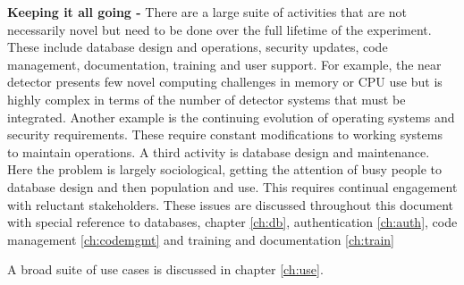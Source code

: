 \documentclass[../main-v1.tex]{subfiles}
\begin{document}
\begin{description}
\item{\bf Keeping it all going -}  There are a large suite of activities that are not necessarily novel but need to be done over the full lifetime of the experiment.  These include database design and operations, security updates, code management, documentation, training and user support.   For example, the near detector presents few novel computing challenges in memory or CPU use but is highly complex in terms of the number of detector systems that must be integrated. Another example is the continuing evolution of operating systems and security requirements.  These require constant modifications to working systems to maintain operations.  A third activity is database design and maintenance. Here the problem is largely sociological, getting the attention of busy people to database design and then population and use.  This requires continual engagement with reluctant stakeholders. These issues are discussed throughout this document with special reference to databases, chapter \ref{ch:db}, authentication \ref{ch:auth}, code management \ref{ch:codemgmt} and training and documentation \ref{ch:train}
\end{description}
A broad suite of use cases is discussed in chapter \ref{ch:use}.


\end{document}

